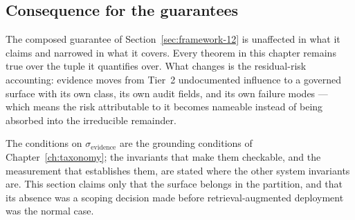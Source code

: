 \subsection{Consequence for the guarantees}

The composed guarantee of Section~\ref{sec:framework-12} is unaffected in what it claims and
narrowed in what it covers. Every theorem in this chapter remains true over the tuple it
quantifies over. What changes is the residual-risk accounting: evidence moves from Tier~2
undocumented influence to a governed surface with its own class, its own audit fields, and
its own failure modes --- which means the risk attributable to it becomes nameable
instead of being absorbed into the irreducible remainder.

The conditions on $\sigma_{\mathrm{evidence}}$ are the grounding conditions of
Chapter~\ref{ch:taxonomy}; the invariants that make them checkable, and the
measurement that establishes them, are stated where the other system invariants are. This section
claims only that the surface belongs in the partition, and that its absence was a
scoping decision made before retrieval-augmented deployment was the normal case.
